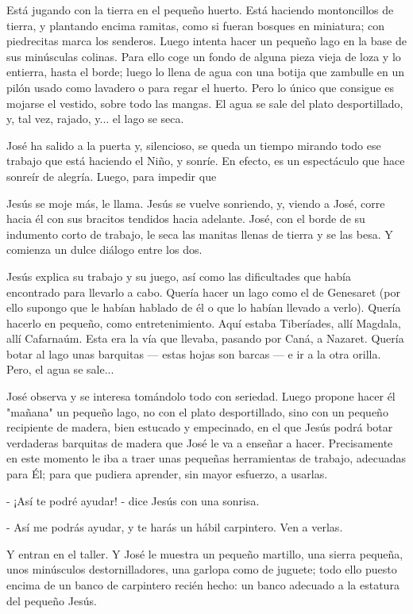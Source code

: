 \documentclass[12pt, twoside, openright]{book} %
\begin{document}
Está jugando con la tierra en el pequeño huerto. Está haciendo montoncillos de tierra, y plantando encima ramitas, como si fueran bosques en miniatura; con piedrecitas marca los senderos. Luego intenta hacer un pequeño lago en la base de sus minúsculas colinas. Para ello coge un fondo de alguna pieza vieja de loza y lo entierra, hasta el borde; luego lo llena de agua con una botija que zambulle en un pilón usado como lavadero o para regar el huerto. Pero lo único que consigue es mojarse el vestido, sobre todo las mangas. El agua se sale del plato desportillado, y, tal vez, rajado, y... el lago se seca. 

José ha salido a la puerta y, silencioso, se queda un tiempo mirando todo ese trabajo que está haciendo el Niño, y sonríe. En efecto, es un espectáculo que hace sonreír de alegría. Luego, para impedir que 

Jesús se moje más, le llama. Jesús se vuelve sonriendo, y, viendo a José, corre hacia él con sus bracitos tendidos hacia adelante. José, con el borde de su indumento corto de trabajo, le seca las manitas llenas de tierra y se las besa. Y comienza un dulce diálogo entre los dos. 

Jesús explica su trabajo y su juego, así como las dificultades que había encontrado para llevarlo a cabo. Quería hacer un lago como el de Genesaret (por ello supongo que le habían hablado de él o que lo habían llevado a verlo). Quería hacerlo en pequeño, como entretenimiento. Aquí estaba Tiberíades, allí Magdala, allí Cafarnaúm. Esta era la vía que llevaba, pasando por Caná, a Nazaret. Quería botar al lago unas barquitas — estas hojas son barcas — e ir a la otra orilla. Pero, el agua se sale... 

José observa y se interesa tomándolo todo con seriedad. Luego propone hacer él "mañana" un pequeño lago, no con el plato desportillado, sino con un pequeño recipiente de madera, bien estucado y empecinado, en el que Jesús podrá botar verdaderas barquitas de madera que José le va a enseñar a hacer. Precisamente en este momento le iba a traer unas pequeñas herramientas de trabajo, adecuadas para Él; para que pudiera aprender, sin mayor esfuerzo, a usarlas. 

- ¡Así te podré ayudar! - dice Jesús con una sonrisa. 

- Así me podrás ayudar, y te harás un hábil carpintero. Ven a verlas. 

Y entran en el taller. Y José le muestra un pequeño martillo, una sierra pequeña, unos minúsculos destornilladores, una garlopa como de juguete; todo ello puesto encima de un banco de carpintero recién hecho: un banco adecuado a la estatura del pequeño Jesús. 
\end{document}
